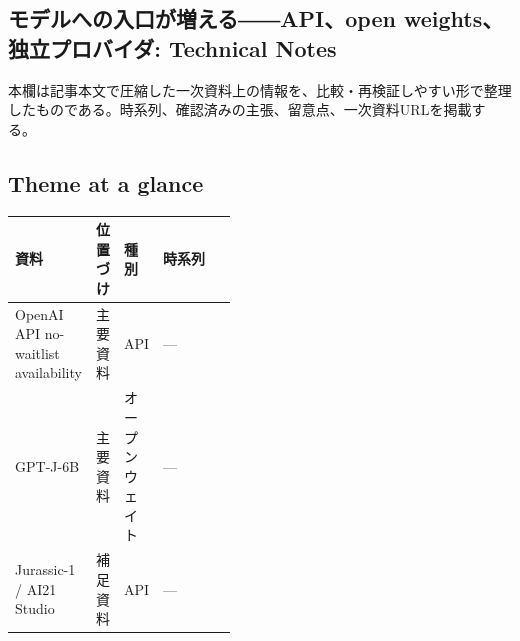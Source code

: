 \subsection*{モデルへの入口が増える――API、open weights、独立プロバイダ: Technical Notes}
本欄は記事本文で圧縮した一次資料上の情報を、比較・再検証しやすい形で整理したものである。時系列、確認済みの主張、留意点、一次資料URLを掲載する。
\smallskip
{}\par
\medskip
\subsection*{Theme at a glance}
\begin{center}
\footnotesize
\begin{tabularx}{\linewidth}{@{}p{0.20\linewidth}p{0.10\linewidth}p{0.14\linewidth}X@{}}
\toprule
資料 & 位置づけ & 種別 & 時系列 \\
\midrule
OpenAI API no-waitlist availability & 主要資料 & API & — \\
GPT-J-6B & 主要資料 & オープンウェイト & — \\
Jurassic-1 / AI21 Studio & 補足資料 & API & — \\
\bottomrule
\end{tabularx}
\end{center}
\normalsize

